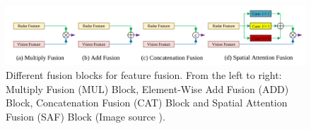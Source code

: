 \documentclass[report.tex]{subfiles}
\begin{document}
    \begin{figure}[h]
        \centering
        \includegraphics[width=1.1\textwidth]{images/methods/saf_fcos/different_fusion_blocks_for_feature_fusion.png}
        \caption{Different fusion blocks for feature fusion. From the left to right: Multiply Fusion (MUL) Block, Element-Wise Add Fusion (ADD) Block, Concatenation Fusion (CAT) Block and Spatial Attention Fusion (SAF) Block (Image source \cite{chang2020spatial}).}
        \label{fig:saffcos_different_fusion_blocks_for_feature_fusion}
    \end{figure}



\end{document}
